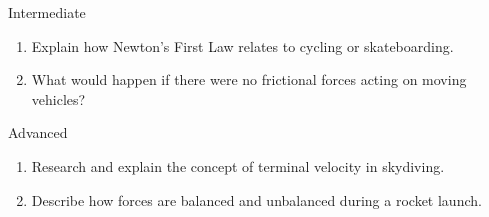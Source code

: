 \begin{tieredquestions}{Intermediate}
\begin{enumerate}
    \item Explain how Newton’s First Law relates to cycling or skateboarding.
    \item What would happen if there were no frictional forces acting on moving vehicles?
\end{enumerate}
\end{tieredquestions}

\begin{tieredquestions}{Advanced}
\begin{enumerate}
    \item Research and explain the concept of terminal velocity in skydiving.
    \item Describe how forces are balanced and unbalanced during a rocket launch.
\end{enumerate}
\end{tieredquestions}